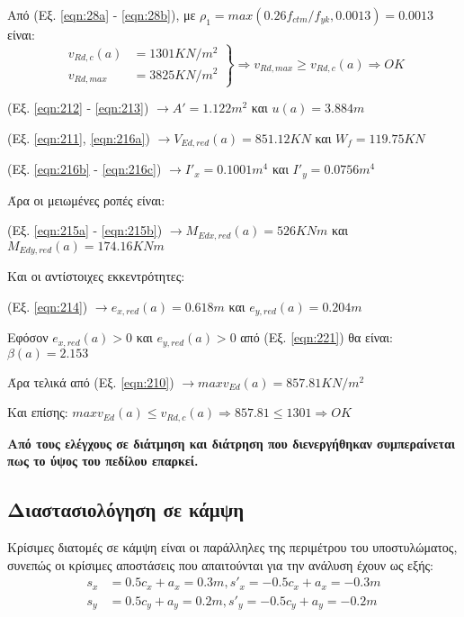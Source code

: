 \noindent
Από (Eξ. \ref{eqn:28a} - \ref{eqn:28b}), με ${\rho}_1 = max\left(0.26 f_{ctm} / f_{yk}, 0.0013\right) = 0.0013$ είναι:
\begin{equation*}
	\left.
    \begin{array}{ll}
        v_{Rd,c}\left(a\right) & = 1301 KN/{m^2}\\
        v_{Rd,max} & = 3825 KN/{m^2}
    \end{array}
	\right \}\Rightarrow v_{Rd,max} \geq v_{Rd,c}\left(a\right) \Rightarrow OK
\end{equation*}

(Eξ. \ref{eqn:212} - \ref{eqn:213}) $\rightarrow A' = 1.122 m^2$ και $u\left(a\right) = 3.884 m$

(Eξ. \ref{eqn:211}, \ref{eqn:216a}) $\rightarrow V_{Ed,red}\left(a\right) = 851.12 KN$ και $W_f = 119.75 KN$

(Eξ. \ref{eqn:216b} - \ref{eqn:216c}) $\rightarrow I'_x = 0.1001 m^4$ και $I'_y = 0.0756 m^4$

\noindent
Άρα οι μειωμένες ροπές είναι:

(Eξ. \ref{eqn:215a} - \ref{eqn:215b}) $\rightarrow M_{Edx,red}\left(a\right) = 526 KNm$ και $M_{Edy,red}\left(a\right) = 174.16 KNm$

\noindent
Και οι αντίστοιχες εκκεντρότητες:

(Eξ. \ref{eqn:214}) $\rightarrow e_{x,red}\left(a\right) = 0.618 m$ και $e_{y,red}\left(a\right) = 0.204 m$

\noindent
Εφόσον $e_{x,red}\left(a\right) > 0$ και $e_{y,red}\left(a\right) > 0$ από (Eξ. \ref{eqn:221}) θα είναι: $\beta\left(a\right) = 2.153$

\medskip 

\noindent
Άρα τελικά από (Eξ. \ref{eqn:210}) $\rightarrow maxv_{Ed}\left(a\right) = 857.81 KN/m^2$

\medskip

\noindent
Και επίσης: $maxv_{Ed}\left(a\right) \leq v_{Rd,c}\left(a\right)\Rightarrow 857.81 \leq 1301 \Rightarrow OK$ 

\bigskip

\noindent
\textbf{\textcolor{mygreen}{Από τους ελέγχους σε διάτμηση και διάτρηση που διενεργήθηκαν συμπεραίνεται πως το ύψος του πεδίλου επαρκεί.}}

\subsection{Διαστασιολόγηση σε κάμψη}
Κρίσιμες διατομές σε κάμψη είναι οι παράλληλες της περιμέτρου του υποστυλώματος, συνεπώς οι κρίσιμες αποστάσεις που απαιτούνται για την ανάλυση έχουν ως εξής:
\begin{align*}
s_x & = 0.5 c_x + a_x = 0.3m, s'_x =- 0.5 c_x + a_x = -0.3m\\[10pt]
s_y & = 0.5 c_y + a_y = 0.2m, s'_y = - 0.5 c_y + a_y = -0.2m
\end{align*}

